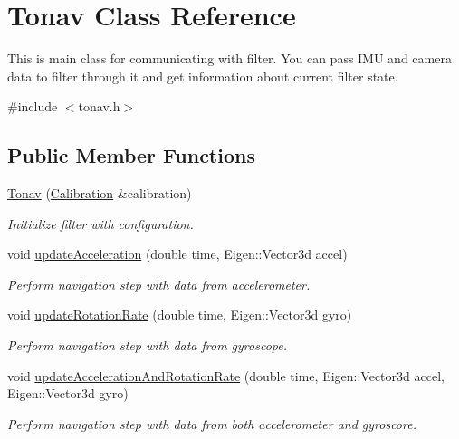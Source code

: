 \hypertarget{class_tonav}{\section{Tonav Class Reference}
\label{class_tonav}
}


This is main class for communicating with filter. You can pass I\-M\-U and camera data to filter through it and get information about current filter state.  




{\ttfamily \#include $<$tonav.\-h$>$}

\subsection*{Public Member Functions}
\begin{DoxyCompactItemize}
\item 
\hyperlink{class_tonav_a0c3d527cc8ec6832d4ea650ad31c726a}{Tonav} (\hyperlink{class_calibration}{Calibration} \&calibration)
\begin{DoxyCompactList}\small\item\em Initialize filter with configuration. \end{DoxyCompactList}\item 
void \hyperlink{class_tonav_ac458c8712b1eeef1ba169835706d26fd}{update\-Acceleration} (double time, Eigen\-::\-Vector3d accel)
\begin{DoxyCompactList}\small\item\em Perform navigation step with data from accelerometer. \end{DoxyCompactList}\item 
void \hyperlink{class_tonav_a02a596cd5acf1799830499dd97e5e2e5}{update\-Rotation\-Rate} (double time, Eigen\-::\-Vector3d gyro)
\begin{DoxyCompactList}\small\item\em Perform navigation step with data from gyroscope. \end{DoxyCompactList}\item 
void \hyperlink{class_tonav_ac7c7cdaa16941df03aca92a3eaa75ed7}{update\-Acceleration\-And\-Rotation\-Rate} (double time, Eigen\-::\-Vector3d accel, Eigen\-::\-Vector3d gyro)
\begin{DoxyCompactList}\small\item\em Perform navigation step with data from both accelerometer and gyroscore. \end{DoxyCompactList}\item 

\end{DoxyCompactItemize}

